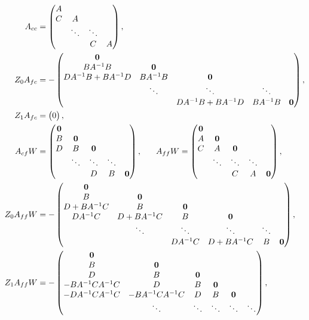 \documentclass[a4paper,12pt]{article}
\begin{document}
\begin{align*}
A_{cc} &= 
\begin{pmatrix}
	A \\ 
	C & A \\
	& \ddots & \ddots  \\
	& & C & A
\end{pmatrix},
\\
Z_0A_{fc} &=-
\begin{pmatrix}
	\mathbf{0} \\
	BA^{-1}B  & \mathbf{0} \\ 
	DA^{-1}B + BA^{-1}D & BA^{-1}B & \mathbf{0} \\
	& \ddots & \ddots & \ddots \\
	& & DA^{-1}B + BA^{-1}D & BA^{-1}B & \mathbf{0} 
\end{pmatrix},
\\
Z_1A_{fc} & =
\begin{pmatrix}
0
\end{pmatrix}, 
\\
A_{cf}W & = 
\begin{pmatrix}
	\mathbf{0} \\
	B  & \mathbf{0} \\ 
	D & B & \mathbf{0} \\
	& \ddots & \ddots & \ddots \\
	& & D & B & \mathbf{0} 
\end{pmatrix},
\hspace{4ex}
A_{ff}W = 
\begin{pmatrix}
	\mathbf{0} \\
	A & \mathbf{0} \\ 
	C & A & \mathbf{0}\\
	& \ddots & \ddots & \ddots  \\
	& & C & A & \mathbf{0}
\end{pmatrix},
\\
Z_0A_{ff}W & = -
\begin{pmatrix}
	\mathbf{0} \\
	B & \mathbf{0} \\ 
	D + BA^{-1}C & B & \mathbf{0} \\
	DA^{-1}C & D + BA^{-1}C & B & \mathbf{0} \\
	& \ddots & \ddots & \ddots & \ddots \\
	& & DA^{-1}C & D + BA^{-1}C & B & \mathbf{0}
\end{pmatrix},
\\
Z_1A_{ff}W & = -
\begin{pmatrix}
	\mathbf{0} \\
	B & \mathbf{0} \\ 
	D & B & \mathbf{0} \\
	-BA^{-1}CA^{-1}C & D & B & \mathbf{0} \\
	-DA^{-1}CA^{-1}C & -BA^{-1}CA^{-1}C & D & B & \mathbf{0} \\
	& \ddots & \ddots & \ddots & \ddots & \ddots \\
\end{pmatrix},
\end{align*}
%
\end{document}
